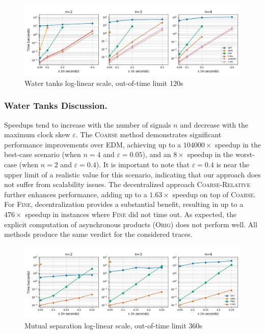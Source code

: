\begin{figure}[htb]
	\begin{center}
		\includegraphics[width=\linewidth]{wtlin.png}
		\caption{Water tanks log-linear scale, out-of-time limit 120s}
	\end{center}
\end{figure}

\subsubsection{Water Tanks Discussion.}
Speedups tend to increase with the number of signals \(n\) and decrease with the maximum clock skew \(\varepsilon\).
The \textsc{Coarse} method demonstrates significant performance improvements over EDM, achieving up to a $104000\times$ speedup in the best-case scenario (when \(n=4\) and \(\varepsilon=0.05\)), and an $8\times$ speedup in the worst-case (when \(n=2\) and \(\varepsilon=0.4\)).
It is important to note that \(\varepsilon=0.4\) is near the upper limit of a realistic value for this scenario, indicating that our approach does not suffer from scalability issues.
The decentralized approach \textsc{Coarse-Relative} further enhances performance, adding up to a $1.63\times$ speedup on top of \textsc{Coarse}.
For \textsc{Fine}, decentralization provides a substantial benefit, resulting in up to a $476\times$ speedup in instances where \textsc{Fine} did not time out.
As expected, the explicit computation of asynchronous products (\textsc{Orig}) does not perform well.
All methods produce the same verdict for the considered traces.

\begin{figure}[htb]
	\begin{center}
		\includegraphics[width=\linewidth]{ms.png}
		\caption{Mutual separation log-linear scale, out-of-time limit 360s}
	\end{center}
\end{figure}

